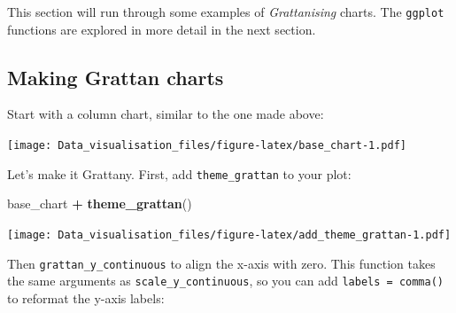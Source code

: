 \documentclass[]{book}
\newenvironment{Shaded}{\begin{snugshade}}{\end{snugshade}}
\newcommand{\DataTypeTok}[1]{\textcolor[rgb]{0.13,0.29,0.53}{#1}}
\newcommand{\KeywordTok}[1]{\textcolor[rgb]{0.13,0.29,0.53}{\textbf{#1}}}
\newcommand{\NormalTok}[1]{#1}
\newcommand{\OperatorTok}[1]{\textcolor[rgb]{0.81,0.36,0.00}{\textbf{#1}}}
\newcommand{\StringTok}[1]{\textcolor[rgb]{0.31,0.60,0.02}{#1}}
\begin{document}
This section will run through some examples of \emph{Grattanising} charts. The \texttt{ggplot} functions are explored in more detail in the next section.

\hypertarget{making-grattan-charts}{%
\subsection{Making Grattan charts}\label{making-grattan-charts}}

Start with a column chart, similar to the one made above:

\begin{Shaded}
\end{Shaded}

\texttt{[image: Data\_visualisation\_files/figure-latex/base\_chart-1.pdf]}

Let's make it Grattany. First, add \texttt{theme\_grattan} to your plot:

\begin{Shaded}
\begin{Highlighting}[]
\NormalTok{base_chart }\OperatorTok{+}
\StringTok{        }\KeywordTok{theme_grattan}\NormalTok{()}
\end{Highlighting}
\end{Shaded}

\texttt{[image: Data\_visualisation\_files/figure-latex/add\_theme\_grattan-1.pdf]}

Then \texttt{grattan\_y\_continuous} to align the x-axis with zero. This function takes the same arguments as \texttt{scale\_y\_continuous}, so you can add \texttt{labels\ =\ comma()} to reformat the y-axis labels:
\end{document}
